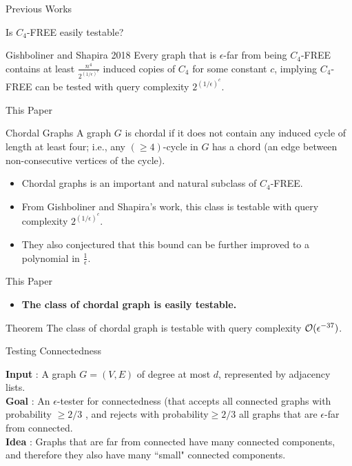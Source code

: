 \documentclass{beamer}
\begin{document}
\begin{frame}{Previous Works}
	\begin{center}
	
		\alert{ \huge Is $C_4$-FREE easily testable?}
	\end{center}
\pause
\begin{block}{Gishboliner and Shapira 2018}
	Every graph that is $\epsilon$-far  from being $C_4$-FREE  contains at least $\frac{n^4}{2^{(1/\epsilon)^c}}$ induced copies of $C_4$ for some constant $c$, implying $C_4$-FREE  can be tested with query complexity $2^{(1/\epsilon)^c}$.
\end{block}
\end{frame}

\begin{frame}{This Paper}
	
	\begin{block}{Chordal Graphs}
		A graph $G$ is chordal if it does not contain any induced cycle of length at least four; i.e., any $(\ge 4)$-cycle in $G$ has a chord (an edge between non-consecutive vertices of the cycle).
	\end{block}
	\pause
	\begin{itemize}
		\item Chordal graphs is an important and natural subclass of $C_4$-FREE. \pause
		\item From Gishboliner and Shapira's work, this class is testable with query complexity $2^{(1/\epsilon)^c}$. \pause
		\item They also conjectured that this bound can be further improved to a polynomial in $\frac{1}{\epsilon}$.
	\end{itemize}

\end{frame}

\begin{frame}{This Paper}
	\begin{itemize}
		\item {\bf The class of chordal graph is easily testable.}
	\end{itemize}
	\begin{block}{Theorem}
		The class of chordal graph is testable with query complexity ${\cal O}(\epsilon ^{-37})$.
	\end{block}
	
\end{frame}

\begin{frame}{Testing Connectedness}
	
	{\bf Input} : A graph $G = (V, E)$ of degree at most $d$, represented by adjacency lists. \\
	\pause
	 {\bf Goal } : An $\epsilon$-tester for connectedness (that accepts all connected graphs with probability $\ge 2/3$
	 , and
	rejects with probability$\ge 2/3$ all graphs that are $\epsilon$-far from connected. \\
	\pause
	{\bf Idea} :  Graphs that are far from connected have many connected components, and therefore they also
	have many ``small" connected components.
\end{frame}
\end{document}
